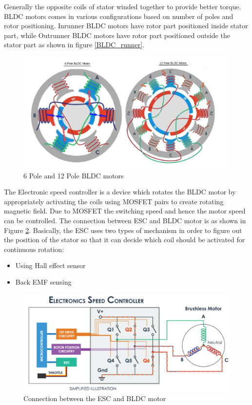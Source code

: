 \par Generally the opposite coils of stator winded together to provide better torque. BLDC motors comes in various configurations based on number of poles and rotor positioning. Inrunner BLDC motors have rotor part positioned inside stator part, while Outrunner BLDC motors have rotor part positioned outside the stator part as shown in figure \ref{BLDC_runner}.

\begin{figure}[h!]
\centering
\includegraphics[width=11cm]{./Figures/BLDC_pole.jpg}
\caption{6 Pole and 12 Pole BLDC motors}
\label{BLDC_pole}
\end{figure}

The Electronic speed controller is a device which rotates the BLDC motor by appropriately activating the coils using MOSFET pairs to create rotating magnetic field. Due to MOSFET the switching speed and hence the motor speed can be controlled. The connection between ESC and BLDC motor is as shown in Figure \ref{ESC_BLDC_connection}. Basically, the ESC uses two types of mechanism in order to figure out the position of the stator so that it can decide which coil should be activated for continuous rotation:
\begin{itemize}
    \item Using Hall effect sensor
    \item Back EMF sensing
\end{itemize}

\begin{figure}[ht]
\centering
\includegraphics[width=14cm]{./Figures/ESC_BLDC_connection.png}
\caption{Connection between the ESC and BLDC motor}
\label{ESC_BLDC_connection}
\end{figure}

